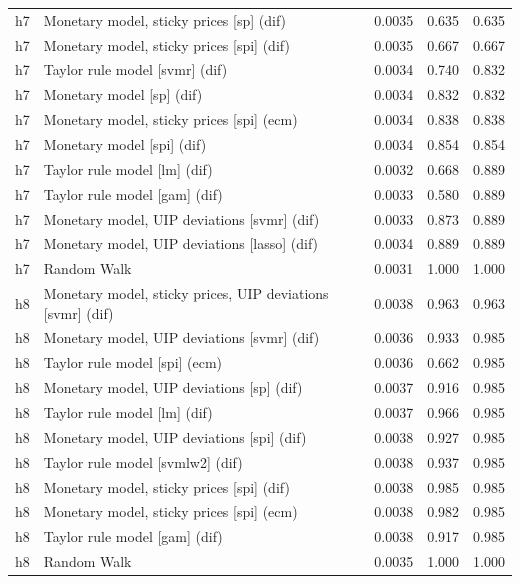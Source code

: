 \begin{ThreePartTable}
\begin{longtable}[t]{cp{5.5cm}ccc}
\addlinespace
h7 & \raggedright Monetary model, sticky prices [sp] (dif) & 0.0035 & 0.635 & 0.635\\
h7 & \raggedright Monetary model, sticky prices [spi] (dif) & 0.0035 & 0.667 & 0.667\\
h7 & \raggedright Taylor rule model [svmr] (dif) & 0.0034 & 0.740 & 0.832\\
h7 & \raggedright Monetary model [sp] (dif) & 0.0034 & 0.832 & 0.832\\
h7 & \raggedright Monetary model, sticky prices [spi] (ecm) & 0.0034 & 0.838 & 0.838\\
h7 & \raggedright Monetary model [spi] (dif) & 0.0034 & 0.854 & 0.854\\
h7 & \raggedright Taylor rule model [lm] (dif) & 0.0032 & 0.668 & 0.889\\
h7 & \raggedright Taylor rule model [gam] (dif) & 0.0033 & 0.580 & 0.889\\
h7 & \raggedright Monetary model, UIP deviations [svmr] (dif) & 0.0033 & 0.873 & 0.889\\
h7 & \raggedright Monetary model, UIP deviations [lasso] (dif) & 0.0034 & 0.889 & 0.889\\
h7 & \raggedright Random Walk & 0.0031 & 1.000 & 1.000\\
\addlinespace
h8 & \raggedright Monetary model, sticky prices, UIP deviations [svmr] (dif) & 0.0038 & 0.963 & 0.963\\
h8 & \raggedright Monetary model, UIP deviations [svmr] (dif) & 0.0036 & 0.933 & 0.985\\
h8 & \raggedright Taylor rule model [spi] (ecm) & 0.0036 & 0.662 & 0.985\\
h8 & \raggedright Monetary model, UIP deviations [sp] (dif) & 0.0037 & 0.916 & 0.985\\
h8 & \raggedright Taylor rule model [lm] (dif) & 0.0037 & 0.966 & 0.985\\
h8 & \raggedright Monetary model, UIP deviations [spi] (dif) & 0.0038 & 0.927 & 0.985\\
h8 & \raggedright Taylor rule model [svmlw2] (dif) & 0.0038 & 0.937 & 0.985\\
h8 & \raggedright Monetary model, sticky prices [spi] (dif) & 0.0038 & 0.985 & 0.985\\
h8 & \raggedright Monetary model, sticky prices [spi] (ecm) & 0.0038 & 0.982 & 0.985\\
h8 & \raggedright Taylor rule model [gam] (dif) & 0.0038 & 0.917 & 0.985\\
h8 & \raggedright Random Walk & 0.0035 & 1.000 & 1.000\\

\end{longtable}
\end{ThreePartTable}
